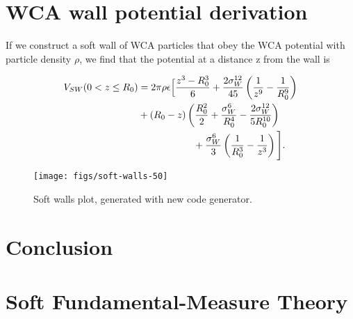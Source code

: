 \documentclass[letterpaper,twocolumn,amsmath,amssymb,prb]{revtex4-1}
\begin{document}
\section{WCA wall potential derivation}

If we construct a soft wall of WCA particles that obey the WCA potential
with particle density $\rho$, we find that the potential at a distance
z from the wall is

\begin{align}
V_{SW}(0 < z \leq R_0) &= 2\pi\rho\epsilon\Big[ \frac{z^3-R_0^3}{6} +
  \frac{2\sigma_W^{12}}{45} \left(\frac{1}{z^9}-\frac{1}{R_0^9}\right)
  \notag \\
  &+ \left( R_0 - z \right)\left(\frac{R_0^2}{2} +
  \frac{\sigma_W^6}{R_0^4} - \frac{2\sigma_W^{12}}{5R_0^{10}}\right)
  \notag \\
  &\hspace{2cm}+\frac{\sigma_W^6}{3}\left(\frac{1}{R_0^3}-\frac{1}{z^3}
  \right) \Bigg].
\end{align}

\begin{figure}
  \texttt{[image: figs/soft-walls-50]}
  \caption{Soft walls plot, generated with new code generator.}
\end{figure}

\section{Conclusion}

\appendix

\section{Soft Fundamental-Measure Theory}
\end{document}

